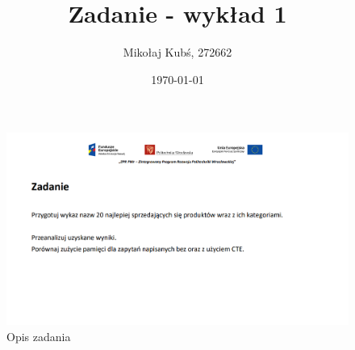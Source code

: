 \documentclass[a4paper,12pt]{article}
\title{Zadanie - wykład 1}
\author{Mikołaj Kubś, 272662}
\date{\today}
\begin{document}
\maketitle

\begin{figure}[H]
    \centering
    \includegraphics[width=1\textwidth]{images/task.png}
    \caption{Opis zadania}
\end{figure}
\end{document}
